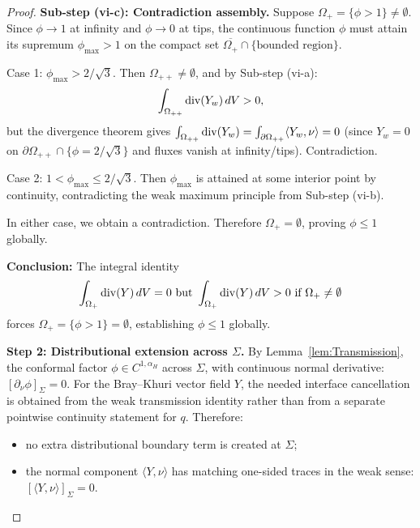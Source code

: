 \begin{proof}
\textbf{Sub-step (vi-c): Contradiction assembly.}
Suppose $\Omega_+ = \{\phi > 1\} \neq \emptyset$. Since $\phi \to 1$ at infinity and $\phi \to 0$ at tips, the continuous function $\phi$ must attain its supremum $\phi_{\max} > 1$ on the compact set $\overline{\Omega_+} \cap \{\text{bounded region}\}$.

Case 1: $\phi_{\max} > 2/\sqrt{3}$. Then $\Omega_{++} \neq \emptyset$, and by Sub-step (vi-a):
\begin{equation}
    \int_{\Omega_{++}} \mathrm{div}(Y_w) \, dV > 0,
\end{equation}
but the divergence theorem gives $\int_{\Omega_{++}} \mathrm{div}(Y_w) = \int_{\partial\Omega_{++}} \langle Y_w, \nu \rangle = 0$ (since $Y_w = 0$ on $\partial\Omega_{++} \cap \{\phi = 2/\sqrt{3}\}$ and fluxes vanish at infinity/tips). Contradiction.

Case 2: $1 < \phi_{\max} \le 2/\sqrt{3}$. Then $\phi_{\max}$ is attained at some interior point by continuity, contradicting the weak maximum principle from Sub-step (vi-b).

In either case, we obtain a contradiction. Therefore $\Omega_+ = \emptyset$, proving $\phi \le 1$ globally.

\textbf{Conclusion:} The integral identity
\begin{equation}
    \int_{\Omega_+} \mathrm{div}(Y) \, dV = 0 \text{ but } \int_{\Omega_+} \mathrm{div}(Y) \, dV > 0 \text{ if } \Omega_+ \neq \emptyset
\end{equation}
forces $\Omega_+ = \{\phi > 1\} = \emptyset$, establishing $\phi \le 1$ globally.

\textbf{Step 2: Distributional extension across $\Sigma$.}
By Lemma~\ref{lem:Transmission}, the conformal factor $\phi \in C^{1,\alpha_H}$ across $\Sigma$, with continuous normal derivative: $[\partial_\nu \phi]_\Sigma = 0$. For the Bray--Khuri vector field $Y$, the needed interface cancellation is obtained from the weak transmission identity rather than from a separate pointwise continuity statement for $q$. Therefore:
\begin{itemize}
    \item no extra distributional boundary term is created at $\Sigma$;
    \item the normal component $\langle Y, \nu \rangle$ has matching one-sided traces in the weak sense: $[\langle Y, \nu \rangle]_\Sigma = 0$.
\end{itemize}


\end{proof}
